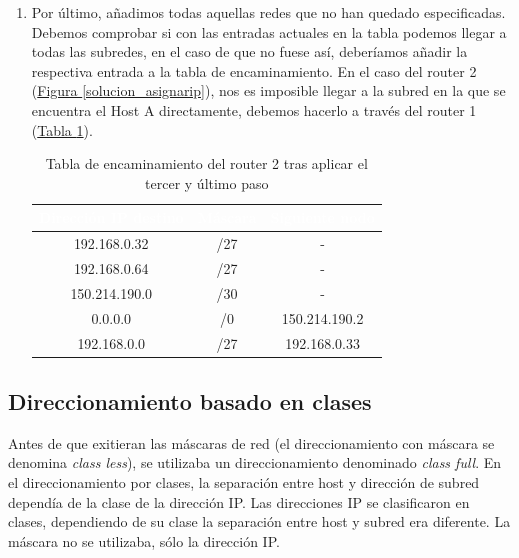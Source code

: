\documentclass[10pt,a4paper,spanish]{report}
\begin{document}
\begin{enumerate}[1.]
  \item Por último, añadimos todas aquellas redes que no han quedado especificadas. Debemos comprobar si con las entradas actuales en la tabla podemos llegar a todas las subredes, en el caso de que no fuese así, deberíamos añadir la respectiva entrada a la tabla de encaminamiento. En el caso del router 2 (\hyperref[solucion_asignarip]{Figura \ref*{solucion_asignarip}}), nos es imposible llegar a la subred en la que se encuentra el Host A directamente, debemos hacerlo a través del router 1 (\hyperref[tablar22]{Tabla \ref*{tablar22}}).

  \begin{table}[H]
    \centering
    \begin{tabular}{|c|c|c|}
     \hline
    \rowcolor[rgb]{0.0,0.58,0.71} \textcolor{white}{Dirección IP destino} & \textcolor{white}{Máscara} & \textcolor{white}{Siguiente nodo} \\
    \hline
     192.168.0.32 & /27 & - \\
    \hline
     192.168.0.64 & /27 & - \\
    \hline
     150.214.190.0 & /30 & - \\
    \hline
     0.0.0.0 & /0 & 150.214.190.2 \\
    \hline
     192.168.0.0 & /27 & 192.168.0.33 \\
    \hline
    \end{tabular}
    \caption{Tabla de encaminamiento del router 2 tras aplicar el tercer y último paso}
    \label{tablar22}
  \end{table}
\end{enumerate}


\subsection{\textcolor{tema4}Direccionamiento basado en clases}
Antes de que exitieran las máscaras de red (el direccionamiento con máscara se denomina \textit{\textcolor{tema4}{class less}}), se utilizaba un direccionamiento denominado \textit{\textcolor{tema4}{class full}}. En el direccionamiento por clases, la separación entre host y dirección de subred dependía de la clase de la dirección IP. Las direcciones IP se clasificaron en clases, dependiendo de su clase la separación entre host y subred era diferente. La máscara no se utilizaba, sólo la dirección IP.
\end{document}
